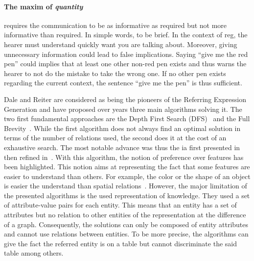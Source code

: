 \paragraph{The maxim of \textit{quantity}} requires the communication to be as informative as required but not more informative than required. In simple words, to be brief. In the context of \acrshort{reg}, the hearer must understand quickly want you are talking about. Moreover, giving unnecessary information could lead to false implications. Saying ``give me the red pen'' could implies that at least one other non-red pen exists and thus warns the hearer to not do the mistake to take the wrong one. If no other pen exists regarding the current context, the sentence ``give me the pen'' is thus sufficient.

Dale and Reiter are considered as being the pioneers of the Referring Expression Generation and have proposed over years three main algorithms solving it. The two first fundamental approaches are the Depth First Search (DFS)~\cite{dale_1989_cooking} and the Full Brevity~\cite{dale_1992_generating}. While the first algorithm does not always find an optimal solution in terms of the number of relations used, the second does it at the cost of an exhaustive search. The most notable advance was thus the \acrfull{ia} first presented in~\cite{reiter_1992_fast} then refined in~\cite{dale_1995_computational}. With this algorithm, the notion of preference over features has been highlighted. This notion aims at representing the fact that some features are easier to understand than others. For example, the color or the shape of an object is easier the understand than spatial relations~\cite{belke_2002_tracking}. However, the major limitation of the presented algorithms is the used representation of knowledge. They used a set of attribute-value pairs for each entity. This means that an entity has a set of attributes but no relation to other entities of the representation at the difference of a graph. Consequently, the solutions can only be composed of entity attributes and cannot use relations between entities. To be more precise, the algorithms can give the fact the referred entity is on a table but cannot discriminate the said table among others.

